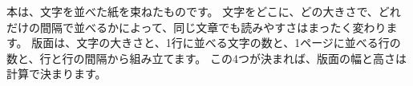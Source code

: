 \documentclass{article}
\begin{document}
本は、文字を並べた紙を束ねたものです。
文字をどこに、どの大きさで、どれだけの間隔で並べるかによって、同じ文章でも読みやすさはまったく変わります。
版面は、文字の大きさと、1行に並べる文字の数と、1ページに並べる行の数と、行と行の間隔から組み立てます。
この4つが決まれば、版面の幅と高さは計算で決まります。
\end{document}
